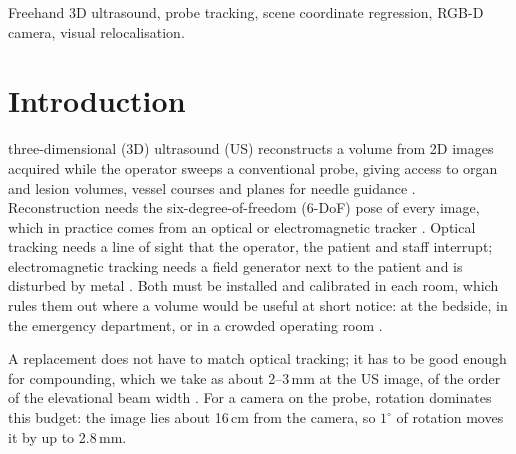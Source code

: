 \documentclass[9pt,shortpaper,twoside,web]{ieeecolor2}
\begin{document}
\begin{IEEEkeywords}
Freehand 3D ultrasound, probe tracking, scene coordinate regression, RGB-D camera, visual relocalisation.
\end{IEEEkeywords}



\section{Introduction}
\label{sec:introduction}

 three-dimensional (3D) ultrasound (US) reconstructs a volume from 2D images acquired while the operator sweeps a conventional probe, giving access to organ and lesion volumes, vessel courses and planes for needle guidance \cite{TODO-3dus-clinical-applications}. Reconstruction needs the six-degree-of-freedom (6-DoF) pose of every image, which in practice comes from an optical or electromagnetic tracker \cite{TODO-freehand-3dus-review}. Optical tracking needs a line of sight that the operator, the patient and staff interrupt; electromagnetic tracking needs a field generator next to the patient and is disturbed by metal \cite{TODO-em-tracking-distortion}. Both must be installed and calibrated in each room, which rules them out where a volume would be useful at short notice: at the bedside, in the emergency department, or in a crowded operating room \cite{TODO-point-of-care-3dus}.

A replacement does not have to match optical tracking; it has to be good enough for compounding, which we take as about 2--3\,mm at the US image, of the order of the elevational beam width \cite{TODO-elevational-beamwidth}. For a camera on the probe, rotation dominates this budget: the image lies about 16\,cm from the camera, so $1^\circ$ of rotation moves it by up to 2.8\,mm.
\end{document}
